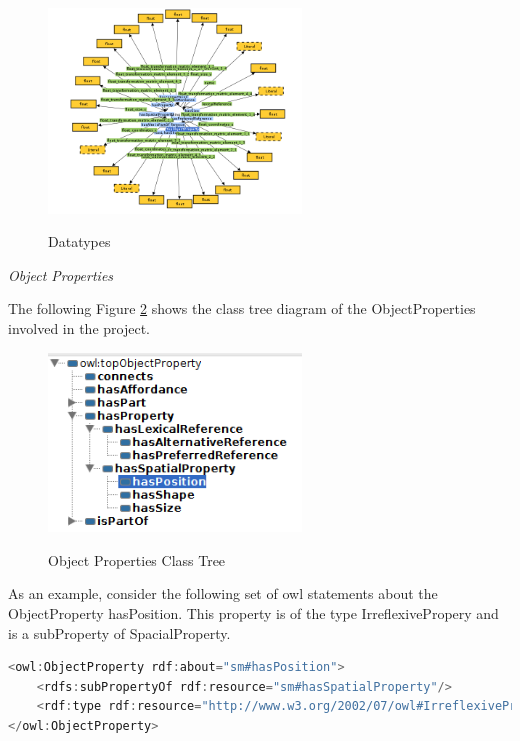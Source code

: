 \begin{figure}[H]
\centering
\includegraphics[width=0.6\textwidth]{imgs/Datatype.png}
\label{fig:datatypes}
\caption{Datatypes}
\end{figure}

\textit{Object Properties}

The following Figure \ref{fig:propClassTree} shows the class tree diagram of the ObjectProperties involved in the project.
\begin{figure}[H]
\centering
\includegraphics[width=0.6\textwidth]{imgs/propClassTree.png}
\label{fig:propClassTree}
\caption{Object Properties Class Tree}
\end{figure}

As an example, consider the following set of owl statements about the ObjectProperty hasPosition. This property is of the type IrreflexivePropery and is a subProperty of SpacialProperty.

\begin{lstlisting}[language=Java,basicstyle=\fontsize{9}{9}\selectfont\ttfamily]
<owl:ObjectProperty rdf:about="sm#hasPosition">
    <rdfs:subPropertyOf rdf:resource="sm#hasSpatialProperty"/>
    <rdf:type rdf:resource="http://www.w3.org/2002/07/owl#IrreflexiveProperty"/>
</owl:ObjectProperty>
\end{lstlisting}    

